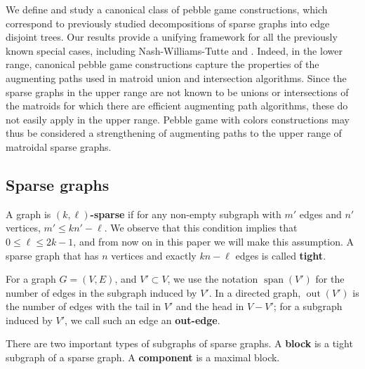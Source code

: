 \documentclass[Svgc,nospthms]{Svgc}
\newcommand{\grsp}{\ensuremath{\operatorname{span}}}
\newcommand{\out}{\ensuremath{\operatorname{out}}}
\begin{document}
		We define and study a canonical class of pebble game constructions, 
		which correspond to previously studied decompositions of sparse graphs 
		into edge disjoint trees.  
		Our results provide a unifying framework for all the previously known special cases, 
		including Nash-Williams-Tutte and \cite{whiteley:union-matroids,haas:2002}.
		Indeed, in the lower range,
		canonical pebble game constructions capture the properties of the augmenting paths 
		used in matroid union and intersection algorithms\cite{gabow:jcss-1995,gabow:forests:1992}.  
		Since the sparse
		graphs in the upper range are not known to be unions or intersections of the matroids 
		for which there are efficient augmenting path algorithms, these do not easily apply in
		the upper range.  Pebble game with colors constructions may thus be considered 
		a strengthening of augmenting paths to the upper range of matroidal sparse graphs.


\subsection{Sparse graphs}
	A graph is {\bf $(k,\ell)$-sparse} if for any non-empty subgraph with $m'$
	edges and $n'$ vertices,
	\(
		m' \le kn'-\ell. 
	\)
We observe that this condition implies that $0\le \ell\le 2k-1$, and from now
on in this paper we will make this assumption.  A sparse graph that has $n$ vertices and exactly $kn-\ell$ edges is called {\bf tight}.

	
For a graph $G=(V,E)$, and $V'\subset V$, we use the notation $\grsp (V')$ for the number of edges in the subgraph induced by $V'$.  In a directed graph, $\out (V')$ is the number of edges with the tail 
in $V'$ and the head in $V-V'$; for a subgraph induced by $V'$, we call such an edge an 
{\bf out-edge}.

There are two important types of subgraphs of sparse graphs. 
A {\bf block} is a tight subgraph of a sparse graph. A {\bf component} is a maximal block.  
	
\end{document}
